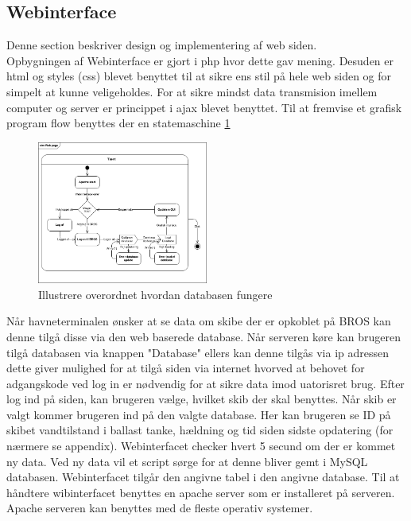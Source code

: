 \subsection{Webinterface}
Denne section beskriver design og implementering af web siden.\\
Opbygningen af Webinterface er gjort i php hvor dette gav mening. Desuden er html og styles (css) blevet benyttet til at sikre ens stil på hele web siden og for simpelt at kunne veligeholdes. For at sikre mindst data transmision imellem computer og server er princippet i ajax blevet benyttet.
Til at fremvise et grafisk program flow benyttes der en statemaschine \ref{fig:stm_web}
 
\begin{figure}[H]
\centering
\includegraphics[width = 0.5\textwidth]{billeder/Systemarkitektur/stm_web}
\caption{Illustrere overordnet hvordan databasen fungere}
\label{fig:stm_web}
\end{figure}

Når havneterminalen ønsker at se data om skibe der er opkoblet på BROS kan denne tilgå disse via den web baserede database. Når serveren køre kan brugeren tilgå databasen via knappen "Database" ellers kan denne tilgås via ip adressen dette giver mulighed for at tilgå siden via internet hvorved at behovet for adgangskode ved log in er nødvendig for at sikre data imod uatorisret brug. Efter log ind på siden, kan brugeren vælge, hvilket skib der skal benyttes. Når skib er valgt kommer brugeren ind på den valgte database. Her kan brugeren se ID på skibet vandtilstand i ballast tanke, hældning og tid siden sidste opdatering (for nærmere se appendix). Webinterfacet checker hvert 5 secund om der er kommet ny data. Ved ny data vil et script sørge for at denne bliver gemt i MySQL databasen. Webinterfacet tilgår den angivne tabel i den angivne database. Til at håndtere wibinterfacet benyttes en apache server som er installeret på serveren. Apache serveren kan benyttes med de fleste operativ systemer.

